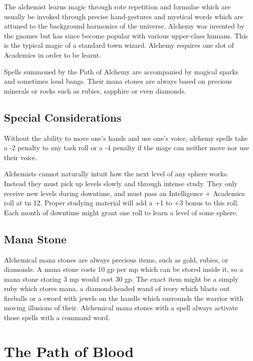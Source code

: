 \documentclass[titlepage,a4paper,openany]{book}
\begin{document}
\begin{multicols}{2}

\noindent The alchemist learns magic through rote repetition and formulae which are usually be invoked through precise hand-gestures and mystical words which are attuned to the background harmonics of the universe.  Alchemy was invented by the gnomes but has since become popular with various upper-class humans. This is the typical magic of a standard town wizard. Alchemy requires one slot of Academics in order to be learnt.

Spells summoned by the Path of Alchemy are accompanied by magical sparks and sometimes loud bangs. Their mana stones are always based on precious minerals or rocks such as rubies, sapphire or even diamonds. 

\subsection{Special Considerations}

Without the ability to move one's hands and use one's voice, alchemy spells take a -2 penalty to any task roll or a -4 penalty if the mage can neither move nor use their voice.

Alchemists cannot naturally intuit how the next level of any sphere works. Instead they must pick up levels slowly and through intense study. They only receive new levels during \gls{downtime}, and must pass an Intelligence + Academics roll at \gls{tn} 12. Proper studying material will add a +1 to +3 bonus to this roll. Each month of \gls{downtime} might grant one roll to learn a level of some sphere.

\subsection{Mana Stone}

Alchemical mana stones are always precious items, such as gold, rubies, or diamonds.  A mana stone costs 10 gp per \gls{mp} which can be stored inside it, so a mana stone storing 3 \gls{mp} would cost 30 gp. The exact item might be a simply ruby which stores mana, a diamond-headed wand of ivory which blasts out fireballs or a sword with jewels on the handle which surrounds the warrior with moving illusions of their. Alchemical mana stones with a spell always activate those spells with a command word.

\end{multicols}

\section{The Path of Blood}
\end{document}
